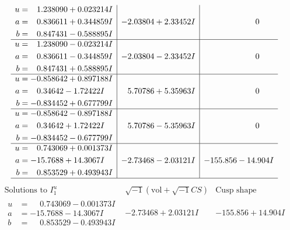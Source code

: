 \documentclass[1p]{elsarticle_modified}
\theoremstyle{definition}
\newcommand{\I}{\sqrt{-1}}
\begin{document}
$$\begin{array}{c|c|c}
\begin{aligned}
u &= \phantom{-}1.238090 + 0.023214 I \\
a &= \phantom{-}0.836611 + 0.344859 I \\
b &= \phantom{-}0.847431 - 0.588895 I\end{aligned}
 & -2.03804 + 2.33452 I & \phantom{-0.000000 } 0 \\ \hline\begin{aligned}
u &= \phantom{-}1.238090 - 0.023214 I \\
a &= \phantom{-}0.836611 - 0.344859 I \\
b &= \phantom{-}0.847431 + 0.588895 I\end{aligned}
 & -2.03804 - 2.33452 I & \phantom{-0.000000 } 0 \\ \hline\begin{aligned}
u &= -0.858642 + 0.897188 I \\
a &= \phantom{-}0.34642 - 1.72422 I \\
b &= -0.834452 + 0.677799 I\end{aligned}
 & \phantom{-}5.70786 + 5.35963 I & \phantom{-0.000000 } 0 \\ \hline\begin{aligned}
u &= -0.858642 - 0.897188 I \\
a &= \phantom{-}0.34642 + 1.72422 I \\
b &= -0.834452 - 0.677799 I\end{aligned}
 & \phantom{-}5.70786 - 5.35963 I & \phantom{-0.000000 } 0 \\ \hline\begin{aligned}
u &= \phantom{-}0.743069 + 0.001373 I \\
a &= -15.7688 + 14.3067 I \\
b &= \phantom{-}0.853529 + 0.493943 I\end{aligned}
 & -2.73468 - 2.03121 I & -155.856 - 14.904 I\\
 \hline 
 \end{array}$$\newpage$$\begin{array}{c|c|c}  
\text{Solutions to }I^u_{1}& \I (\text{vol} + \sqrt{-1}CS) & \text{Cusp shape}\\
 \hline 
\begin{aligned}
u &= \phantom{-}0.743069 - 0.001373 I \\
a &= -15.7688 - 14.3067 I \\
b &= \phantom{-}0.853529 - 0.493943 I\end{aligned}
 & -2.73468 + 2.03121 I & -155.856 + 14.904 I \\ \hline\begin{aligned}

\end{aligned}
\end{array}$$
\end{document}
